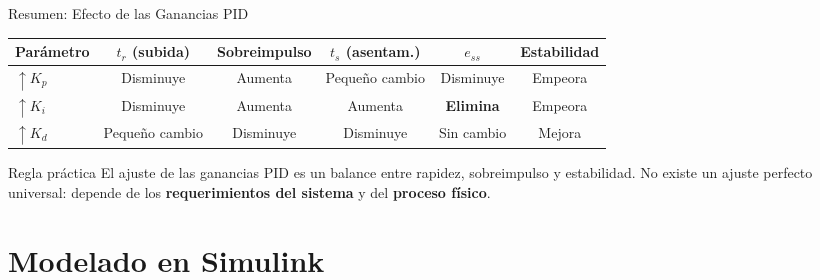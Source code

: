 \documentclass[aspectratio=169,xcolor=dvipsnames]{beamer}
\begin{document}
\begin{frame}{Resumen: Efecto de las Ganancias PID}
    \footnotesize
    \begin{center}
    \begin{tabular}{lccccc}
        \toprule
        \textbf{Parámetro} & \textbf{$t_r$ (subida)} & \textbf{Sobreimpulso} & \textbf{$t_s$ (asentam.)} & \textbf{$e_{ss}$} & \textbf{Estabilidad} \\
        \midrule
        $\uparrow K_p$ & Disminuye & Aumenta & Pequeño cambio & Disminuye & Empeora \\
        $\uparrow K_i$ & Disminuye & Aumenta & Aumenta & \textbf{Elimina} & Empeora \\
        $\uparrow K_d$ & Pequeño cambio & Disminuye & Disminuye & Sin cambio & Mejora \\
        \bottomrule
    \end{tabular}
    \end{center}
    \vspace{0.5em}
    \begin{alertblock}{Regla práctica}
        El ajuste de las ganancias PID es un balance entre rapidez, sobreimpulso y estabilidad. No existe un ajuste perfecto universal: depende de los \textbf{requerimientos del sistema} y del \textbf{proceso físico}.
    \end{alertblock}
\end{frame}

\section{Modelado en Simulink}
\end{document}
